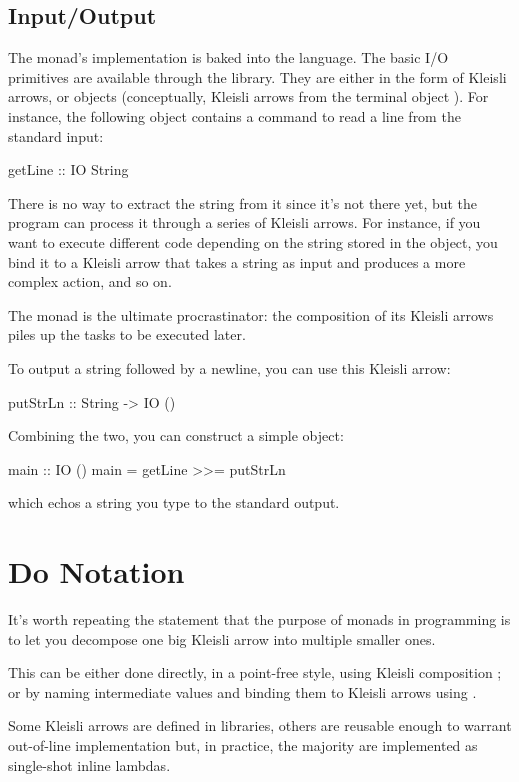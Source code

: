 \documentclass[DaoFP]{subfiles}
\begin{document}
\subsection{Input/Output}

The  monad's implementation is baked into the language. The basic I/O primitives are available through the library. They are either in the form of Kleisli arrows, or  objects (conceptually, Kleisli arrows from the terminal object \hask{()}). For instance, the following object contains a command to read a line from the standard input:
\begin{haskell}
getLine :: IO String
\end{haskell}
There is no way to extract the string from it since it's not there yet, but the program can process it through a series of Kleisli arrows. For instance, if you want to execute different code depending on the string stored in the  object, you bind it to a Kleisli arrow that takes a string as input and produces a more complex  action, and so on. 

The  monad is the ultimate procrastinator: the composition of its Kleisli arrows piles up the tasks to be executed later.

To output a string followed by a newline, you can use this Kleisli arrow:
\begin{haskell}
putStrLn :: String -> IO ()
\end{haskell}
Combining the two, you can construct a simple  object:
\begin{haskell}
main :: IO ()
main = getLine >>= putStrLn
\end{haskell}
which echos a string you type to the standard output.

\section{Do Notation}

It's worth repeating the statement that the purpose of monads in programming is to let you decompose one big Kleisli arrow into multiple smaller ones. 

This can be either done directly, in a point-free style, using Kleisli composition \hask{<=<}; or by naming intermediate values and binding them to Kleisli arrows using \hask{>>=}. 

Some Kleisli arrows are defined in libraries, others are reusable enough to warrant out-of-line implementation but, in practice, the majority are implemented as single-shot inline lambdas.
\end{document}
